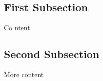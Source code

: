 \documentclass{ximera}
\begin{document}
\subsection{First Subsection}\label{subsec:refone}

Co ntent

\subsection{Second Subsection}\label{subsec:reftwo}

More content
\end{document}
